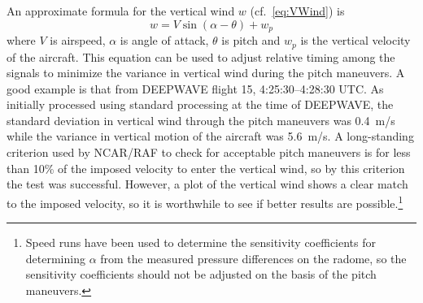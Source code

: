 \documentclass[12pt,twoside,english]{article}\usepackage[]{graphicx}\usepackage[]{color}
\let\OrgIndex\index
\renewcommand*{\index}[1]{\OrgIndex{#1}}
\begin{document}
An approximate formula for the vertical wind $w$ (cf.~\eqref{eq:VWind}) is
\begin{equation}
w=V\sin(\alpha-\theta)+w_{p}\label{eq:Weq} 
\end{equation}
where $V$ is airspeed, $\alpha$ is angle of attack, $\theta$ is pitch and $w_{p}$ is the vertical velocity of the aircraft. This equation can be used to adjust relative timing among the signals to minimize the variance in vertical wind during the pitch maneuvers. A good example is that from DEEPWAVE flight 15, 4:25:30--4:28:30 UTC. As initially processed using standard processing at the time of DEEPWAVE, the standard deviation in vertical wind through the pitch maneuvers was 0.4~m/s while the variance in vertical motion of the aircraft was 5.6~m/s. A long-standing criterion used by NCAR/RAF to check for acceptable pitch maneuvers is for less than 10\% of the imposed velocity to enter the vertical wind, so by this criterion the test was successful. However, a plot of the vertical wind shows a clear match to the imposed velocity, so it is worthwhile to see if better results are possible.\footnote{Speed runs have been used to determine the sensitivity coefficients for determining $\alpha$ from the measured pressure differences on the radome, so the sensitivity coefficients should not be adjusted on the basis of the pitch maneuvers.}
\end{document}
